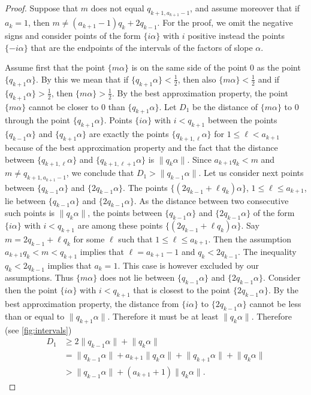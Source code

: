 \documentclass[a4paper,fleqn]{article}
\providecommand{\norm}[1]{\lVert#1\rVert}
\begin{document}
  \begin{proof}
    Suppose that $m$ does not equal $q_{k+1,a_{k+1}-1}$, and assume moreover that if $a_k = 1$, then
    $m \neq (a_{k+1}-1)q_k + 2q_{k-1}$. For the proof, we omit the negative signs and consider points of the form
    $\{i\alpha\}$ with $i$ positive instead the points $\{-i\alpha\}$ that are the endpoints of the intervals of the
    factors of slope $\alpha$.

    Assume first that the point $\{m\alpha\}$ is on the same side of the point $0$ as the point $\{q_{k+1}\alpha\}$.
    By this we mean that if $\{q_{k+1}\alpha\} < \tfrac12$, then also $\{m\alpha\} < \tfrac12$ and if
    $\{q_{k+1}\alpha\} > \tfrac12$, then $\{m\alpha\} > \tfrac 12$. By the best approximation property, the point
    $\{m\alpha\}$ cannot be closer to $0$ than $\{q_{k+1}\alpha\}$. Let $D_1$ be the distance of $\{m\alpha\}$ to $0$
    through the point $\{q_{k+1}\alpha\}$. Points $\{i\alpha\}$ with $i < q_{k+1}$ between the points
    $\{q_{k-1}\alpha\}$ and $\{q_{k+1}\alpha\}$ are exactly the points $\{q_{k+1,\ell}\alpha\}$ for
    $1 \leq \ell < a_{k+1}$ because of the best approximation property and the fact that the distance between
    $\{q_{k+1,\ell}\alpha\}$ and $\{q_{k+1,\ell+1}\alpha\}$ is $\norm{q_k\alpha}$. Since $a_{k+1}q_k < m$ and
    $m \neq q_{k+1,a_{k+1}-1}$, we conclude that $D_1 > \norm{q_{k-1}\alpha}$. Let us consider next points between
    $\{q_{k-1}\alpha\}$ and $\{2q_{k-1}\alpha\}$. The points $\{(2q_{k-1} + \ell q_k)\alpha\}$,
    $1 \leq \ell \leq a_{k+1}$, lie between $\{q_{k-1}\alpha\}$ and $\{2q_{k-1}\alpha\}$. As the distance between two
    consecutive such points is $\norm{q_k\alpha}$, the points between $\{q_{k-1}\alpha\}$ and $\{2q_{k-1}\alpha\}$ of
    the form $\{i\alpha\}$ with $i < q_{k+1}$ are among these points $\{(2q_{k-1} + \ell q_k)\alpha\}$. Say
    $m = 2q_{k-1} + \ell q_k$ for some $\ell$ such that $1 \leq \ell \leq a_{k+1}$. Then the assumption
    $a_{k+1} q_k < m < q_{k+1}$ implies that $\ell = a_{k+1} - 1$ and $q_k < 2q_{k-1}$. The inequality $q_k < 2q_{k-1}$
    implies that $a_k = 1$. This case is however excluded by our assumptions. Thus $\{m\alpha\}$ does not lie between
    $\{q_{k-1}\alpha\}$ and $\{2q_{k-1}\alpha\}$. Consider then the point $\{i\alpha\}$ with $i < q_{k+1}$ that is
    closest to the point $\{2q_{k-1}\alpha\}$. By the best approximation property, the distance from $\{i\alpha\}$ to
    $\{2q_{k-1}\alpha\}$ cannot be less than or equal to $\norm{q_{k+1}\alpha}$. Therefore it must be at least
    $\norm{q_k\alpha}$. Therefore (see \autoref{fig:intervals})
    \begin{align*}
      D_1 &\geq 2\norm{q_{k-1}\alpha} + \norm{q_k\alpha} \\
          &= \norm{q_{k-1}\alpha} + a_{k+1}\norm{q_k\alpha} + \norm{q_{k+1}\alpha} + \norm{q_k\alpha} \\
          &> \norm{q_{k-1}\alpha} + (a_{k+1} + 1)\norm{q_k\alpha}.
    \end{align*}


\end{proof}
\end{document}
